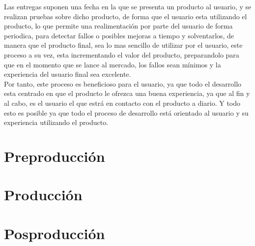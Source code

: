 Las entregas suponen una fecha en la que se presenta un producto al usuario, y se realizan pruebas sobre dicho producto, de forma que el usuario esta utilizando el producto, lo que permite una realimentación por parte del usuario de forma periodica, para detectar fallos o posibles mejoras a tiempo y solventarlos, de manera que el producto final, sea lo mas sencillo de utilizar por el usuario, este proceso a su vez, esta incrementando el valor del producto, preparandolo para que en el momento que se lance al mercado, los fallos sean mínimos y la experiencia del usuario final sea excelente.\\

Por tanto, este proceso es beneficioso para el usuario, ya que todo el desarrollo esta centrado en que el producto le ofrezca una buena experiencia, ya que al fin y al cabo, es el usuario el que estrá en contacto con el producto a diario. Y todo esto es posible ya que todo el proceso de desarrollo está orientado al usuario y su experiencia utilizando el producto.

\section{Preproducción}

\section{Producción}

\section{Posproducción}
